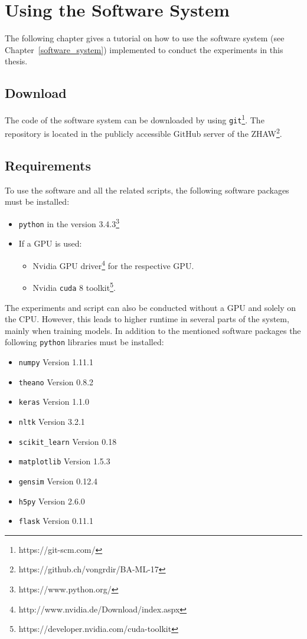\chapter{Using the Software System}
\label{appendix:software_usage}
The following chapter gives a tutorial on how to use the software system (see Chapter~\ref{software_system}) implemented to conduct the experiments in this thesis.

\section{Download}
The code of the software system can be downloaded by using \texttt{git}\footnote{https://git-scm.com/}. The repository is located in the publicly accessible GitHub server of the ZHAW\footnote{https://github.ch/vongrdir/BA-ML-17}.

\section{Requirements}
To use the software and all the related scripts, the following software packages must be installed:

\begin{itemize}[noitemsep]
	\item \texttt{python} in the version 3.4.3\footnote{https://www.python.org/}
	\item If a GPU is used:
	\begin{itemize}[noitemsep]
		\item Nvidia GPU driver\footnote{http://www.nvidia.de/Download/index.aspx} for the respective GPU.
		\item Nvidia \texttt{cuda} 8 toolkit\footnote{https://developer.nvidia.com/cuda-toolkit}.
	\end{itemize}
\end{itemize}

The experiments and script can also be conducted without a GPU and solely on the CPU. However, this leads to higher runtime in several parts of the system, mainly when training models. In addition to the mentioned software packages the following \texttt{python} libraries must be installed:

\begin{itemize}[noitemsep]
	\item \texttt{numpy} Version 1.11.1
	\item \texttt{theano} Version 0.8.2
	\item \texttt{keras} Version 1.1.0
	\item \texttt{nltk} Version 3.2.1
	\item \texttt{scikit{\_}learn} Version 0.18
	\item \texttt{matplotlib} Version 1.5.3
	\item \texttt{gensim} Version 0.12.4
	\item \texttt{h5py} Version 2.6.0
	\item \texttt{flask} Version 0.11.1
\end{itemize}

